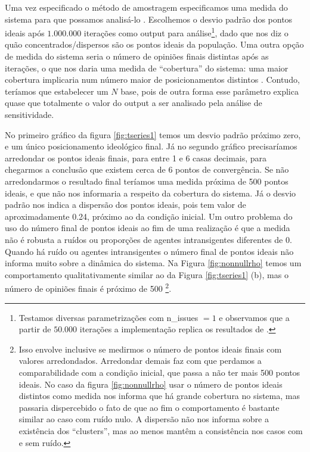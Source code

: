     Uma vez especificado o método de amostragem especificamos uma medida do
    sistema para que possamos analisá-lo \cite{railsback2012agent}. Escolhemos o
    desvio padrão dos pontos ideais após \(1.000.000\) iterações como output
    para análise\footnote{Testamos diversas parametrizações com n\_issues \(=
      1\) e observamos que a partir de \(50.000\) iterações a implementação
      replica os resultados de .}, dado que nos
    diz o quão concentrados/dispersos são os pontos ideais da população. Uma
    outra opção de medida do sistema seria o número de opiniões finais distintas
    após as iterações, o que nos daria uma medida de ``cobertura'' do sistema:
    uma maior cobertura implicaria num número maior de posicionamentos distintos
    \cite{bramson2016disambiguation}. Contudo, teríamos que estabelecer um \(N\)
    base, pois de outra forma esse parâmetro explica quase que totalmente o
    valor do output a ser analisado pela análise de sensitividade.

    No primeiro gráfico da figura \ref{fig:tseries1} temos um desvio padrão
    próximo zero, e um único posicionamento ideológico final. Já no segundo
    gráfico precisaríamos arredondar os pontos ideais finais, para entre 1 e 6
    casas decimais, para chegarmos a conclusão que existem cerca de 6 pontos de
    convergência. Se não arredondarmos o resultado final teríamos uma medida
    próxima de 500 pontos ideais, e que não nos informaria a respeito da
    cobertura do sistema. Já o desvio padrão nos indica a dispersão dos pontos
    ideais, pois tem valor de aproximadamente 0.24, próximo ao da condição
    inicial. Um outro problema do uso do número final de pontos ideais ao fim de
    uma realização é que a medida não é robusta a ruídos ou proporções de
    agentes intransigentes diferentes de 0. Quando há ruído ou agentes
    intransigentes o número final de pontos ideais não informa muito sobre a
    dinâmica do sistema. Na Figura \ref{fig:nonnullrho} temos um comportamento
    qualitativamente similar ao da Figura \ref{fig:tseries1} (b), mas o número
    de opiniões finais é próximo de 500 \footnote{Isso envolve inclusive se
      medirmos o número de pontos ideais finais com valores arredondados.
      Arredondar demais faz com que perdamos a comparabilidade com a condição
      inicial, que passa a não ter mais 500 pontos ideais. No caso da figura
      \ref{fig:nonnullrho} usar o número de pontos ideais distintos como medida
      nos informa que há grande cobertura no sistema, mas passaria dispercebido
      o fato de que ao fim o comportamento é bastante similar ao caso com ruído
      nulo. A dispersão não nos informa sobre a existência dos ``clusters'', mas
      ao menos mantêm a consistência nos casos com e sem ruído.}.
    
